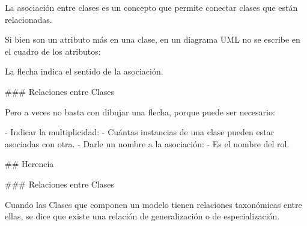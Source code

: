 La asociación entre clases es un concepto que permite conectar clases que están relacionadas.\newline

Si bien son un atributo más en una clase, en un diagrama UML no se escribe en el cuadro de los
atributos:

\vfill

\begin{center}
\end{center}

La flecha indica el sentido de la asociación.

### Relaciones entre Clases

\newline

Pero a veces no basta con dibujar una flecha, porque puede ser necesario:

- Indicar la multiplicidad:
    - Cuántas instancias de una clase pueden estar asociadas con otra.
- Darle un nombre a la asociación:
    - Es el nombre del rol.

\vfill
\begin{center}
\end{center}


## Herencia

### Relaciones entre Clases

\newline

Cuando las Clases que componen un modelo tienen relaciones taxonómicas entre ellas, se
dice que existe una relación de generalización o de especialización.\newline

